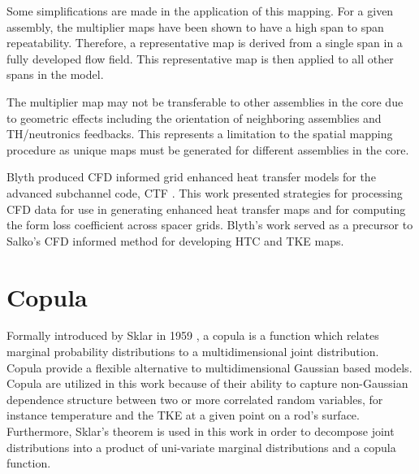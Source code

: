 Some simplifications are made in the application of this mapping.  For a given assembly, the multiplier maps have been shown to have a high span to span repeatability.  Therefore, a representative map is derived from a single span in a fully developed flow field.  This representative map is then applied to all other spans in the model.

The multiplier map may not be transferable to other assemblies in the core due to geometric effects including the orientation of neighboring assemblies and TH/neutronics feedbacks.  This represents a limitation to the spatial mapping procedure as unique maps must be generated for different assemblies in the core.

Blyth produced CFD informed grid enhanced heat transfer models for the advanced subchannel code, CTF \cite{blyth2014} \cite{blyth2017}.  This work presented strategies for processing CFD data for use in generating enhanced heat transfer maps and for computing the form loss coefficient across spacer grids.  Blyth's work served as a precursor to Salko's CFD informed method for developing HTC and TKE maps.


\section{Copula}

Formally introduced by Sklar in 1959 \cite{Sklar1959}, a copula is a function which relates marginal probability distributions to a multidimensional joint distribution.  Copula provide a flexible alternative to multidimensional Gaussian based models.  Copula are utilized in this work because of their ability to capture non-Gaussian dependence structure between two or more correlated random variables, for instance temperature and the TKE at a given point on a rod's surface.  Furthermore, Sklar's theorem is used in this work in order to decompose joint distributions into a product of uni-variate marginal distributions and a copula function.  


